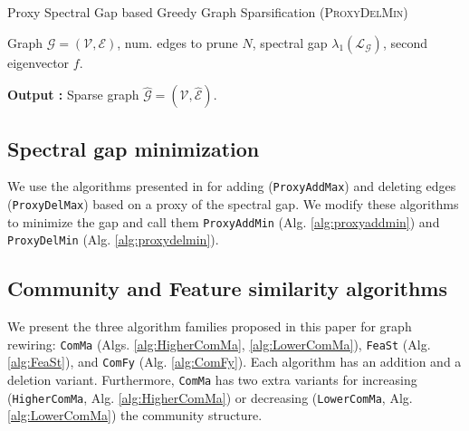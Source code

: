 \begin{algorithm} [t]
   \caption{Proxy Spectral Gap based Greedy Graph Sparsification (\textsc{ProxyDelMin})}
   \label{alg:proxydelmin}
   \begin{algorithmic}
       \REQUIRE \!Graph ${\mathcal{G}} = (\mathcal{V},{\mathcal{E}})$, num. edges to prune $N$, spectral gap $ \lambda_1(\mathcal{L}_{{\mathcal{G}}})$, second eigenvector ${f}$.
       \REPEAT
       \ENDFOR \\
           \vspace{-\medskipamount}

           \textbf{Output :} Sparse graph  $ \hat{\mathcal{G}} = (\mathcal{V},\hat{\mathcal{E}})$.
       \end{algorithmic}
   \end{algorithm}

   
\subsection{Spectral gap minimization}
We use the algorithms presented in \citet{jamadandi2024spectral} for adding (\texttt{ProxyAddMax}) and deleting edges (\texttt{ProxyDelMax}) based on a proxy of the spectral gap. We modify these algorithms to minimize the gap and call them 
\texttt{ProxyAddMin} (Alg. \ref{alg:proxyaddmin}) and \texttt{ProxyDelMin} (Alg. \ref{alg:proxydelmin}).
\subsection{Community and Feature similarity algorithms}
We present the three algorithm families proposed in this paper for graph rewiring: \texttt{ComMa} (Algs. \ref{alg:HigherComMa}, \ref{alg:LowerComMa}), \texttt{FeaSt} (Alg. \ref{alg:FeaSt}), and \texttt{ComFy} (Alg. \ref{alg:ComFy}). Each algorithm has an addition and a deletion variant. Furthermore, \texttt{ComMa} has two extra variants for increasing (\texttt{HigherComMa}, Alg. \ref{alg:HigherComMa}) or decreasing (\texttt{LowerComMa}, Alg. \ref{alg:LowerComMa}) the community structure. 

